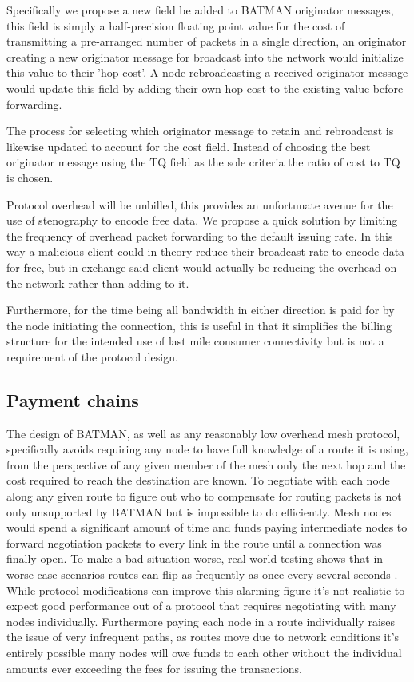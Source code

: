 \documentclass[11pt]{article}
\begin{document}
		Specifically we propose a new field be added to BATMAN originator messages, this field is simply a half-precision floating point value for the cost of transmitting a pre-arranged number of packets in a single direction, an originator creating a new originator message for broadcast into the network would initialize this value to their 'hop cost'. A node rebroadcasting a received originator message would update this field by adding their own hop cost to the existing value before forwarding.

	        The process for selecting which originator message to retain and rebroadcast is likewise updated to account for the cost field. Instead of choosing the best originator message using the TQ field as the sole criteria the ratio of cost to TQ is chosen.

                Protocol overhead will be unbilled, this provides an unfortunate avenue for the use of stenography to encode free data. We propose a quick solution by limiting the frequency of overhead packet forwarding to the default issuing rate. In this way a malicious client could in theory reduce their broadcast rate to encode data for free, but in exchange said client would actually be reducing the overhead on the network rather than adding to it.

                Furthermore, for the time being all bandwidth in either direction is paid for by the node initiating the connection, this is useful in that it simplifies the billing structure for the intended use of last mile consumer connectivity but is not a requirement of the protocol design.

	\subsection{Payment chains} \label{paychains}

               The design of BATMAN, as well as any reasonably low overhead mesh protocol, specifically avoids requiring any node to have full knowledge of a route it is using, from the perspective of any given member of the mesh only the next hop and the cost required to reach the destination are known. To negotiate with each node along any given route to figure out who to compensate for routing packets is not only unsupported by BATMAN but is impossible to do efficiently. Mesh nodes would spend a significant amount of time and funds paying intermediate nodes to forward negotiation packets to every link in the route until a connection was finally open. To make a bad situation worse, real world testing shows that in worse case scenarios routes can flip as frequently as once every several seconds \cite{meshflip}. While protocol modifications can improve this alarming figure it's not realistic to expect good performance out of a protocol that requires negotiating with many nodes individually. Furthermore paying each node in a route individually raises the issue of very infrequent paths, as routes move due to network conditions it's entirely possible many nodes will owe funds to each other without the individual amounts ever exceeding the fees for issuing the transactions.
\end{document}
